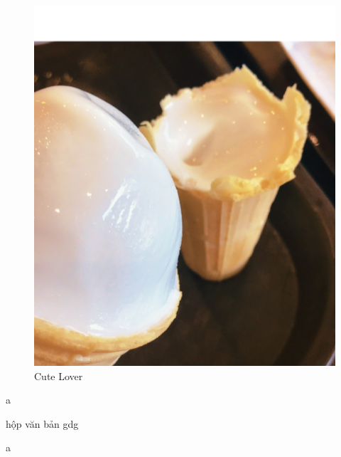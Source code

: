 \documentclass[12pt]{article}
\begin{document}
\newpage

\begin{figure}
    \centering
    \includegraphics[scale=0.15]{cute.png}
    \caption{Cute Lover}
\end{figure}
\blindtext

a \parbox{5cm}{hộp văn bản gdg} a\\

\newpage

\begin{minipage}{0.3\textwidth}
	\blindtext
\end{minipage}
\quad
\begin{minipage}{0.3\textwidth}
	\blindtext
\end{minipage}
\quad
\begin{minipage}{0.3\textwidth}
	\blindtext
\end{minipage}


\newsavebox{\boxname}
\usebox{\boxname}
\usebox{\boxname}
\usebox{\boxname}
\end{document}
